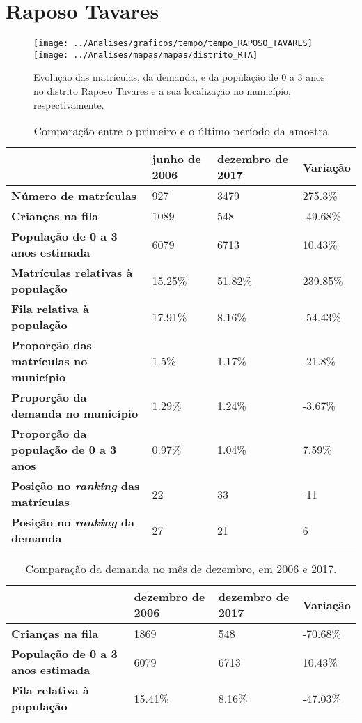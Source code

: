 \section{Raposo Tavares}
\begin{figure}[H]
\centering
\texttt{[image: ../Analises/graficos/tempo/tempo\_RAPOSO\_TAVARES]}
\texttt{[image: ../Analises/mapas/mapas/distrito\_RTA]}
\caption{Evolução das matrículas, da demanda, e da população de 0 a 3 anos no distrito Raposo Tavares e a sua localização no município, respectivamente.}
\end{figure}
\begin{table}[H]
\begin{tabular}{l|l|l|l}
\textbf{}                                      & \textbf{junho de 2006}       & \textbf{dezembro de 2017}    & \textbf{Variação} \\ \hline
\textbf{Número de matrículas}                  & 927 & 3479 & 275.3\% \\ \hline
\textbf{Crianças na fila}                      & 1089 & 548 & -49.68\% \\ \hline
\textbf{População de 0 a 3 anos estimada}      & 6079 & 6713 & 10.43\% \\ \hline
\textbf{Matrículas relativas à população}      & 15.25\% & 51.82\% & 239.85\% \\ \hline
\textbf{Fila relativa à população}             & 17.91\% & 8.16\% & -54.43\% \\ \hline
\textbf{Proporção das matrículas no município} & 1.5\% & 1.17\% & -21.8\% \\ \hline
\textbf{Proporção da demanda no município}     & 1.29\% & 1.24\% & -3.67\% \\ \hline
\textbf{Proporção da população de 0 a 3 anos}  & 0.97\% & 1.04\% & 7.59\% \\ \hline
\textbf{Posição no \textit{ranking} das matrículas}     & 22 & 33 & -11 \\ \hline
\textbf{Posição no \textit{ranking} da demanda}         & 27 & 21 & 6 \\ 
\end{tabular}
\caption{Comparação entre o primeiro e o último período da amostra}
\end{table}
\begin{table}[H]
\begin{tabular}{l|l|l|l}
\textbf{}                                 & \textbf{dezembro de 2006} & \textbf{dezembro de 2017} & \textbf{Variação} \\ \hline
\textbf{Crianças na fila}                      & 1869 & 548 & -70.68\% \\ \hline
\textbf{População de 0 a 3 anos estimada}      & 6079 & 6713 & 10.43\% \\ \hline
\textbf{Fila relativa à população}             & 15.41\% & 8.16\% & -47.03\% \\
\end{tabular}
\caption{Comparação da demanda no mês de dezembro, em 2006 e 2017.}
\end{table}
